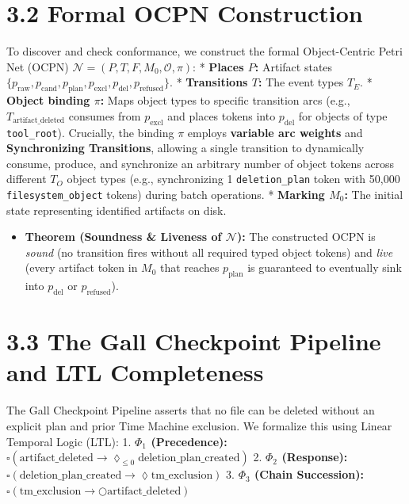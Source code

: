 \documentclass[
  12pt,
]{report}
\providecommand{\tightlist}{%
  \setlength{\itemsep}{0pt}\setlength{\parskip}{0pt}}
\begin{document}
\section{3.2 Formal OCPN Construction}\label{formal-ocpn-construction}

To discover and check conformance, we construct the formal
Object-Centric Petri Net (OCPN)
\(\mathcal{N} = (P, T, F, M_0, \mathcal{O}, \pi)\): * \textbf{Places
\(P\):} Artifact states
\(\{p_{\text{raw}}, p_{\text{cand}}, p_{\text{plan}}, p_{\text{excl}}, p_{\text{del}}, p_{\text{refused}}\}\).
* \textbf{Transitions \(T\):} The event types \(T_E\). * \textbf{Object
binding \(\pi\):} Maps object types to specific transition arcs (e.g.,
\(T_{\text{artifact\_deleted}}\) consumes from \(p_{\text{excl}}\) and
places tokens into \(p_{\text{del}}\) for objects of type
\texttt{tool\_root}). Crucially, the binding \(\pi\) employs
\textbf{variable arc weights} and \textbf{Synchronizing Transitions},
allowing a single transition to dynamically consume, produce, and
synchronize an arbitrary number of object tokens across different
\(T_O\) object types (e.g., synchronizing 1 \texttt{deletion\_plan}
token with 50,000 \texttt{filesystem\_object} tokens) during batch
operations. * \textbf{Marking \(M_0\):} The initial state representing
identified artifacts on disk.

\begin{itemize}
\tightlist
\item
  \textbf{Theorem (Soundness \& Liveness of \(\mathcal{N}\)):} The
  constructed OCPN is \emph{sound} (no transition fires without all
  required typed object tokens) and \emph{live} (every artifact token in
  \(M_0\) that reaches \(p_{\text{plan}}\) is guaranteed to eventually
  sink into \(p_{\text{del}}\) or \(p_{\text{refused}}\)).
\end{itemize}

\section{3.3 The Gall Checkpoint Pipeline and LTL
Completeness}\label{the-gall-checkpoint-pipeline-and-ltl-completeness}

The Gall Checkpoint Pipeline asserts that no file can be deleted without
an explicit plan and prior Time Machine exclusion. We formalize this
using Linear Temporal Logic (LTL): 1. \textbf{\(\Phi_1\) (Precedence):}
\(\square ( \text{artifact\_deleted} \rightarrow \lozenge_{\leq 0} \text{deletion\_plan\_created} )\)
2. \textbf{\(\Phi_2\) (Response):}
\(\square ( \text{deletion\_plan\_created} \rightarrow \lozenge \text{tm\_exclusion} )\)
3. \textbf{\(\Phi_3\) (Chain Succession):}
\(\square ( \text{tm\_exclusion} \rightarrow \bigcirc \text{artifact\_deleted} )\)
\end{document}
